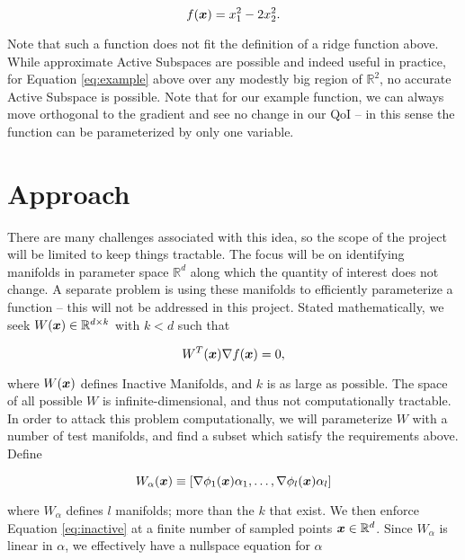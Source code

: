 \documentclass{article}
\begin{document}
\begin{equation}
f(\boldsymbol{x}) = x_1^2 - 2x_2^2. \label{eq:example}
\end{equation}

Note that such a function does not fit the definition of a ridge function above. While approximate Active Subspaces are possible and indeed useful in practice, for Equation \ref{eq:example} above over any modestly big region of $\mathbb{R}^2$, no accurate Active Subspace is possible. Note that for our example function, we can always move orthogonal to the gradient and see no change in our QoI -- in this sense the function can be parameterized by only one variable.

\section{Approach}
There are many challenges associated with this idea, so the scope of the project will be limited to keep things tractable. The focus will be on identifying manifolds in parameter space $\mathbb{R}^d$ along which the quantity of interest does not change. A separate problem is using these manifolds to efficiently parameterize a function -- this will not be addressed in this project. Stated mathematically, we seek $W(\boldsymbol{x})\in\mathbb{R}^{d\times k}$ with $k < d$ such that

\begin{equation}
W^T(\boldsymbol{x})\nabla f(\boldsymbol{x}) = 0, \label{eq:inactive}
\end{equation}

where $W(\boldsymbol{x})$ defines Inactive Manifolds, and $k$ is as large as possible. The space of all possible $W$ is infinite-dimensional, and thus not computationally tractable. In order to attack this problem computationally, we will parameterize $W$ with a number of test manifolds, and find a subset which satisfy the requirements above. Define

\begin{equation}
W_{\alpha}(\boldsymbol{x}) \equiv [\nabla\phi_1(\boldsymbol{x})\alpha_1,\dots,\nabla\phi_l(\boldsymbol{x})\alpha_l]
\end{equation}

where $W_{\alpha}$ defines $l$ manifolds; more than the $k$ that exist. We then enforce Equation \ref{eq:inactive} at a finite number of sampled points $\boldsymbol{x}\in\mathbb{R}^d$. Since $W_{\alpha}$ is linear in $\alpha$, we effectively have a nullspace equation for $\alpha$
\end{document}
